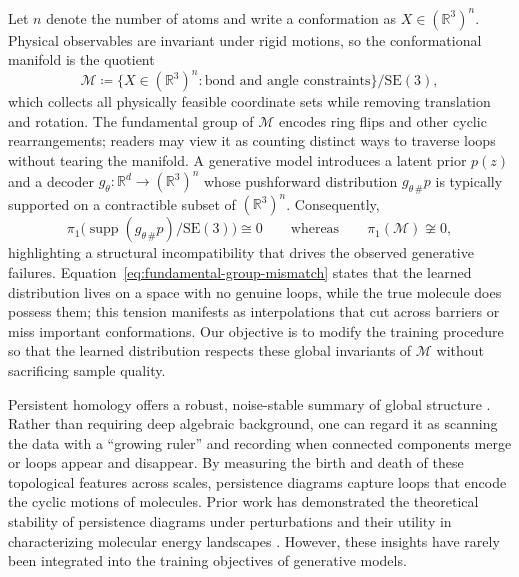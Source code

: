 \documentclass[11pt]{article}
\theoremstyle{definition}
\begin{document}
Let $n$ denote the number of atoms and write a conformation as $X \in (\mathbb{R}^3)^n$. Physical observables are invariant under rigid motions, so the conformational manifold is the quotient
\begin{equation}
    \mathcal{M} \coloneqq \big\{ X \in (\mathbb{R}^3)^n : \text{bond and angle constraints} \big\} / \mathrm{SE}(3),
    \label{eq:manifold}
\end{equation}
which collects all physically feasible coordinate sets while removing translation and rotation. The fundamental group of $\mathcal{M}$ encodes ring flips and other cyclic rearrangements; readers may view it as counting distinct ways to traverse loops without tearing the manifold. A generative model introduces a latent prior $p(z)$ and a decoder $g_\theta : \mathbb{R}^d \to (\mathbb{R}^3)^n$ whose pushforward distribution $g_{\theta\,\#}p$ is typically supported on a contractible subset of $(\mathbb{R}^3)^n$. Consequently,
\begin{equation}
    \pi_1\big( \operatorname{supp}(g_{\theta\,\#}p) / \mathrm{SE}(3) \big) \cong 0 \qquad \text{whereas} \qquad \pi_1(\mathcal{M}) \not\cong 0,
    \label{eq:fundamental-group-mismatch}
\end{equation}
highlighting a structural incompatibility that drives the observed generative failures. Equation~\eqref{eq:fundamental-group-mismatch} states that the learned distribution lives on a space with no genuine loops, while the true molecule does possess them; this tension manifests as interpolations that cut across barriers or miss important conformations. Our objective is to modify the training procedure so that the learned distribution respects these global invariants of $\mathcal{M}$ without sacrificing sample quality.

Persistent homology offers a robust, noise-stable summary of global structure \cite{edelsbrunner2010computational, carlsson2009topology}. Rather than requiring deep algebraic background, one can regard it as scanning the data with a ``growing ruler'' and recording when connected components merge or loops appear and disappear. By measuring the birth and death of these topological features across scales, persistence diagrams capture loops that encode the cyclic motions of molecules. Prior work has demonstrated the theoretical stability of persistence diagrams under perturbations \cite{cohen2007stability} and their utility in characterizing molecular energy landscapes \cite{carlsson2009topology, sommers2023tda}. However, these insights have rarely been integrated into the training objectives of generative models.
\end{document}
